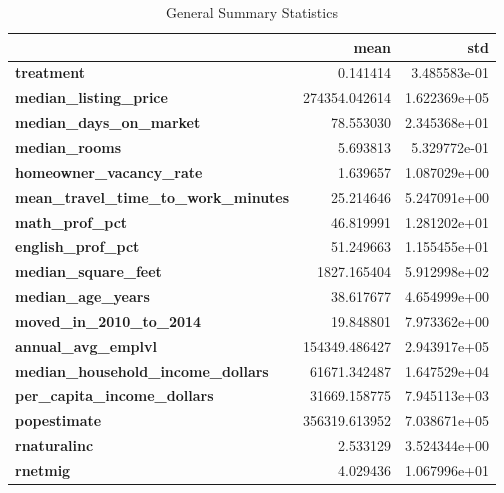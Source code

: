 \begin{table}
    \caption{General Summary Statistics}
    \label{general_stats}
    \begin{tabular}{|l||r|r|}
    \hline
    {} &           mean &           std \\
    \hline
    \hline
    \textbf{treatment                                 } &       0.141414 &  3.485583e-01 \\ \hline
    \textbf{median\_listing\_price                      } &  274354.042614 &  1.622369e+05 \\ \hline
    \textbf{median\_days\_on\_market                     } &      78.553030 &  2.345368e+01 \\ \hline
    \textbf{median\_rooms                              } &       5.693813 &  5.329772e-01 \\ \hline
    \textbf{homeowner\_vacancy\_rate                    } &       1.639657 &  1.087029e+00 \\ \hline
    \textbf{mean\_travel\_time\_to\_work\_minutes          } &      25.214646 &  5.247091e+00 \\ \hline
    \textbf{math\_prof\_pct                             } &      46.819991 &  1.281202e+01 \\ \hline
    \textbf{english\_prof\_pct                          } &      51.249663 &  1.155455e+01 \\ \hline
    \textbf{median\_square\_feet                        } &    1827.165404 &  5.912998e+02 \\ \hline
    \textbf{median\_age\_years                          } &      38.617677 &  4.654999e+00 \\ \hline
    \textbf{moved\_in\_2010\_to\_2014                     } &      19.848801 &  7.973362e+00 \\ \hline
    \textbf{annual\_avg\_emplvl                         } &  154349.486427 &  2.943917e+05 \\ \hline
    \textbf{median\_household\_income\_dollars           } &   61671.342487 &  1.647529e+04 \\ \hline
    \textbf{per\_capita\_income\_dollars                 } &   31669.158775 &  7.945113e+03 \\ \hline
    \textbf{popestimate                               } &  356319.613952 &  7.038671e+05 \\ \hline
    \textbf{rnaturalinc                               } &       2.533129 &  3.524344e+00 \\ \hline
    \textbf{rnetmig                                   } &       4.029436 &  1.067996e+01 \\ \hline

\end{tabular}
\end{table}
